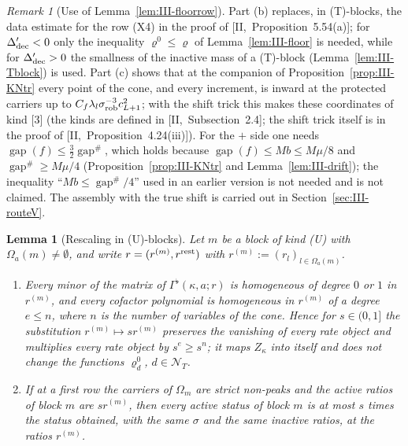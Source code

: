 \documentclass[10pt]{amsart}
\newtheorem{lemma}[theorem]{Lemma}
\theoremstyle{definition}
\theoremstyle{remark}
\newtheorem{remark}[theorem]{Remark}
\newcommand{\gap}{\operatorname{gap}}
\begin{document}
\begin{remark}[Use of Lemma~\ref{lem:III-floorrow}]\label{rem:III-kind3}
Part (b) replaces, in (T)-blocks, the data estimate for the row (X4) in the
proof of [II,~Proposition~5.54(a)]; for $\Delta'_{\rm dec}<0$ only the
inequality $\varrho^0\le\varrho$ of Lemma~\ref{lem:III-floor} is needed, while for
$\Delta'_{\rm dec}>0$ the smallness of the inactive mass of a (T)-block
(Lemma~\ref{lem:III-Tblock}) is used.  Part (c) shows that at the companion
of Proposition~\ref{prop:III-KNtr} every point of the cone, and every
increment, is inward at the protected carriers up to $C_f\lambda_l
\sigma_{\rm rob}^{-3}c_{L+1}^2$; with the shift trick
this makes these coordinates of kind [3] (the kinds are defined in
[II,~Subsection~2.4]; the shift trick itself is in the proof of
[II,~Proposition~4.24(iii)]).  For the $+$ side one needs
$\gap(f)\le\frac32\gap^\#$, which holds because $\gap(f)\le Mb\le M\mu/8$ and
$\gap^\#\ge M\mu/4$ (Proposition~\ref{prop:III-KNtr} and
Lemma~\ref{lem:III-drift}); the inequality ``$Mb\le\gap^\#/4$'' used in an
earlier version is not needed and is not claimed.  The assembly with the
true shift is carried out in Section~\ref{sec:III-routeV}.
\end{remark}

\begin{lemma}[Rescaling in (U)-blocks]\label{lem:III-Uscale}
Let $m$ be a block of kind \textup{(U)} with $\Omega_a(m)\ne\emptyset$, and
write $r=(r^{(m)},r^{\rm rest})$ with $r^{(m)}:=(r_l)_{l\in\Omega_a(m)}$.
\begin{enumerate}
\item[(a)] Every minor of the matrix of $\Gamma^\flat(\kappa,a;r)$ is
homogeneous of degree $0$ or $1$ in $r^{(m)}$, and every cofactor polynomial
is homogeneous in $r^{(m)}$ of a degree $e\le n$, where $n$ is the number of
variables of the cone.  Hence for $s\in(0,1]$ the substitution $r^{(m)}\mapsto
sr^{(m)}$ preserves the vanishing of every rate object and multiplies every
rate object by $s^e\ge s^n$; it maps $Z_\kappa$ into itself and does not
change the functions $\varrho^0_d$, $d\in\mathcal N_T$.
\item[(b)] If at a first row the carriers of $\Omega_m$ are strict non-peaks
and the active ratios of block $m$ are $sr^{(m)}$, then every active status
of block $m$ is at most $s$ times the status obtained, with the same
$\sigma$ and the same inactive ratios, at the ratios $r^{(m)}$.
\end{enumerate}
\end{lemma}
\end{document}
